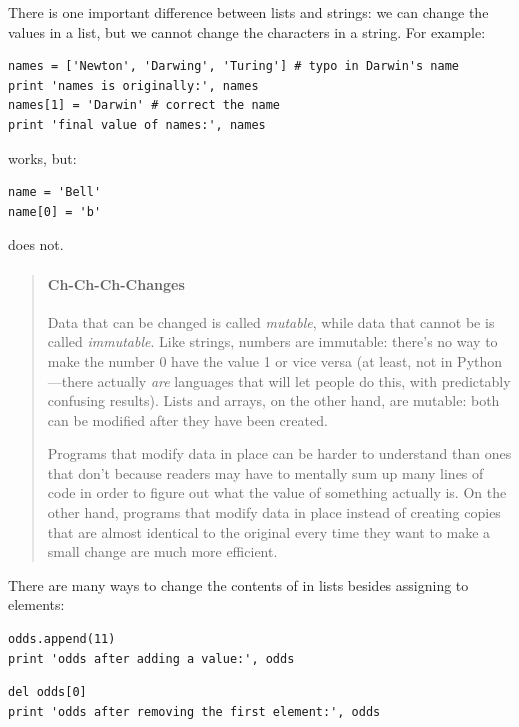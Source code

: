 \documentclass[]{book}
\newcommand{\gdef}[2]{\emph{#2}}
\begin{document}
There is one important difference between lists and strings: we can
change the values in a list, but we cannot change the characters in a
string. For example:

\begin{verbatim}
names = ['Newton', 'Darwing', 'Turing'] # typo in Darwin's name
print 'names is originally:', names
names[1] = 'Darwin' # correct the name
print 'final value of names:', names
\end{verbatim}

works, but:

\begin{verbatim}
name = 'Bell'
name[0] = 'b'
\end{verbatim}

does not.

\begin{quote}
\mbox{}\paragraph{Ch-Ch-Ch-Changes}

Data that can be changed is called \gdef{g:mutable}{mutable}, while
data that cannot be is called \gdef{g:immutable}{immutable}. Like
strings, numbers are immutable: there's no way to make the number 0 have
the value 1 or vice versa (at least, not in Python---there actually
\emph{are} languages that will let people do this, with predictably
confusing results). Lists and arrays, on the other hand, are mutable:
both can be modified after they have been created.

Programs that modify data in place can be harder to understand than ones
that don't because readers may have to mentally sum up many lines of
code in order to figure out what the value of something actually is. On
the other hand, programs that modify data in place instead of creating
copies that are almost identical to the original every time they want to
make a small change are much more efficient.
\end{quote}

There are many ways to change the contents of in lists besides assigning
to elements:

\begin{verbatim}
odds.append(11)
print 'odds after adding a value:', odds
\end{verbatim}

\begin{verbatim}
del odds[0]
print 'odds after removing the first element:', odds
\end{verbatim}
\end{document}
